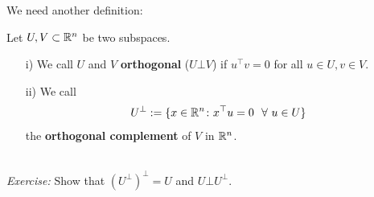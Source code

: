 \begin{frame}
	We need another definition:
	\begin{defi}
		 Let $U,V \subset {\mathbb{R}}^n$ be two subspaces.  
		 \begin{itemize}
		 	\item[i)] We call $U$ and $V$ \textbf{orthogonal} ($U \bot V$) if $u^\top v = 0$ for all $u \in U, v\in V$.
		 	\item[ii)] We call 
		 	$$U^\bot := \{x\in  {\mathbb{R}}^n \colon x^\top u = 0 ~~\forall ~u \in U\} $$
		 	the \textbf{orthogonal complement} of $V$ in ${\mathbb{R}}^{n}$.
		 \end{itemize}
	\end{defi}
~\\
 \textit{Exercise:} {\color{satzrot}Show that $(U^\bot)^\bot = U$ and $U \bot U^\bot$.}
\begin{example}\label{ex:orthogonalSubspaces}
\end{example}
\end{frame}
